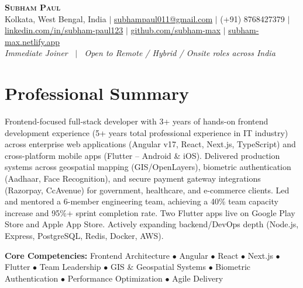 \documentclass[letterpaper,10.5pt]{article}
\begin{document}
\begin{center}
    \textbf{\Huge \scshape Subham Paul} \\ \vspace{4pt}
    \small
    Kolkata, West Bengal, India $|$
    \href{mailto:subhampaul011@gmail.com}{subhampaul011@gmail.com} $|$
    (+91) 8768427379 $|$
    \href{https://linkedin.com/in/subham-paul123}{linkedin.com/in/subham-paul123} $|$
    \href{https://github.com/subham-max}{github.com/subham-max} $|$
    \href{https://subham-max.netlify.app}{subham-max.netlify.app} \\
    \vspace{2pt}
    \textit{Immediate Joiner \, $|$ \, Open to Remote / Hybrid / Onsite roles across India}
\end{center}


\section{Professional Summary}
\small{Frontend-focused full-stack developer with 3+ years of hands-on frontend development experience (5+ years total professional experience in IT industry) across enterprise web applications (Angular v17, React, Next.js, TypeScript) and cross-platform mobile apps (Flutter -- Android \& iOS). Delivered production systems across geospatial mapping (GIS/OpenLayers), biometric authentication (Aadhaar, Face Recognition), and secure payment gateway integrations (Razorpay, CcAvenue) for government, healthcare, and e-commerce clients. Led and mentored a 6-member engineering team, achieving a 40\% team capacity increase and 95\%+ sprint completion rate. Two Flutter apps live on Google Play Store and Apple App Store. Actively expanding backend/DevOps depth (Node.js, Express, PostgreSQL, Redis, Docker, AWS).}

\vspace{4pt}
\small{\textbf{Core Competencies:} Frontend Architecture $\bullet$ Angular $\bullet$ React $\bullet$ Next.js $\bullet$ Flutter $\bullet$ Team Leadership $\bullet$ GIS \& Geospatial Systems $\bullet$ Biometric Authentication $\bullet$ Performance Optimization $\bullet$ Agile Delivery}

\end{document}

